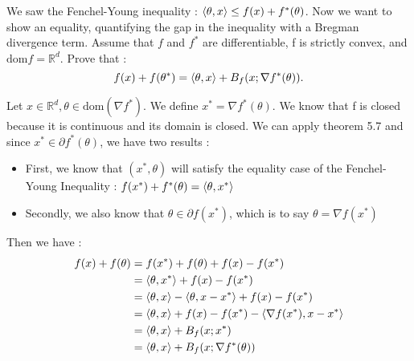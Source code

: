 \begin{exercise}[]{}
	We saw the Fenchel-Young inequality : $ \langle\theta,x\rangle \leq f(x) + f^{*}(\theta) $. Now we want to show an equality, quantifying the gap in the inequality with a Bregman divergence term. Assume that $ f $ and $ f^{*} $ are differentiable, f is strictly convex, and $ \text{dom}f = \mathbb{R}^d $. Prove that :
\begin{equation*}
	f(x) + f(\theta^{*}) = \langle\theta,x\rangle + B_f(x ; \nabla f^{*}(\theta)) .
\end{equation*}

\end{exercise}

\begin{solution}[]
	Let $ x \in \mathbb{R}^d, \theta \in \text{dom}(\nabla f^{*}) $. We define $ x^{*} = \nabla f^{*}(\theta) $. We know that f is closed because it is continuous and its domain is closed. We can apply theorem 5.7 and since $ x^{*} \in \partial f^{*}(\theta) $, we have two results :
\begin{itemize}
	\item First, we know that $ (x^{*}, \theta) $ will satisfy the equality case of the Fenchel-Young Inequality : $ f(x^{*}) + f^{*}(\theta) = \langle\theta,x^{*}\rangle $
	\item Secondly, we also know that $ \theta \in \partial f(x^{*}) $, which is to say $ \theta = \nabla f(x^{*}) $
\end{itemize}
Then we have :
\begin{align*}
	f(x) + f(\theta) &= f(x^{*}) + f(\theta) + f(x) - f(x^{*}) \\
			 &= \langle\theta,x^{*}\rangle + f(x) - f(x^{*}) \\
			 &= \langle\theta,x\rangle - \langle\theta,x-x^{*}\rangle + f(x)-f(x^{*}) \\
			 &= \langle\theta,x\rangle + f(x) - f(x^{*}) -\langle\nabla f(x^{*}),x-x^{*}\rangle \\
			 &= \langle\theta,x\rangle + B_f(x ; x^{*}) \\
			 &= \langle\theta,x\rangle + B_f(x ; \nabla f^{*}(\theta))
\end{align*}

\end{solution}
